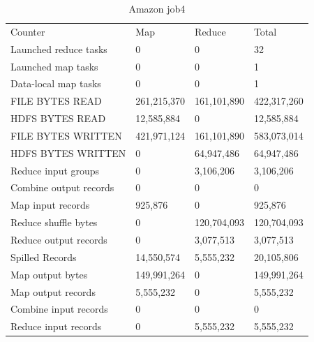 \documentclass[paper=a4, fontsize=11pt]{scrartcl}	%
\numberwithin{equation}{section}															%
\numberwithin{figure}{section}																%
\numberwithin{table}{section}																%
\begin{document}
\begin{table}[]
	\centering
	\caption{Amazon job4}
	\label{my-label}
	\begin{tabular}{llll}
		Counter&	Map&	Reduce&	Total\\
		Launched reduce tasks&	0&	0&	32\\
		Launched map tasks&	0&	0&	1\\
		Data-local map tasks&	0&	0&	1\\
		FILE BYTES READ&	261,215,370&	161,101,890&	422,317,260\\
		HDFS BYTES READ&	12,585,884&	0&	12,585,884\\
		FILE BYTES WRITTEN&	421,971,124&	161,101,890&	583,073,014\\
		HDFS BYTES WRITTEN&	0&	64,947,486&	64,947,486\\
		Reduce input groups&	0&	3,106,206&	3,106,206\\
		Combine output records&	0&	0&	0\\
		Map input records&	925,876&	0&	925,876\\
		Reduce shuffle bytes&	0&	120,704,093&	120,704,093\\
		Reduce output records&	0&	3,077,513&	3,077,513\\
		Spilled Records&	14,550,574	&5,555,232&	20,105,806\\
		Map output bytes&	149,991,264&	0&	149,991,264\\
		Map output records&	5,555,232&	0&	5,555,232\\
		Combine input records&	0&	0&	0\\
		Reduce input records&	0&	5,555,232&	5,555,232\\
	\end{tabular}
\end{table}
\end{document}
